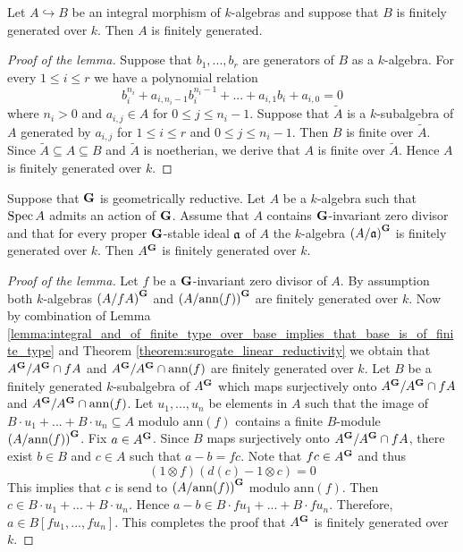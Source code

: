 \begin{lemma}\label{lemma:integral_and_of_finite_type_over_base_implies_that_base_is_of_finite_type}
Let $A\hookrightarrow B$ be an integral morphism of $k$-algebras and suppose that $B$ is finitely generated over $k$. Then $A$ is finitely generated.
\end{lemma}
\begin{proof}[Proof of the lemma]
Suppose that $b_1,...,b_r$ are generators of $B$ as a $k$-algebra. For every $1\leq i \leq r$ we have a polynomial relation
$$b_i^{n_i} + a_{i,n_i-1}b_i^{n_i-1}+...+a_{i,1}b_i+ a_{i,0} = 0$$
where $n_i > 0$ and $a_{i,j}\in A$ for $0\leq j\leq n_i-1$. Suppose that $\tilde{A}$ is a $k$-subalgebra of $A$ generated by $a_{i,j}$ for $1\leq i\leq r$ and $0\leq j\leq n_i-1$. Then $B$ is finite over $\tilde{A}$. Since $\tilde{A}\subseteq A\subseteq B$ and $\tilde{A}$ is noetherian, we derive that $A$ is finite over $\tilde{A}$. Hence $A$ is finitely generated over $k$.
\end{proof}

\begin{lemma}\label{lemma:nagata_theorem_case_of_invariant_zero_divisors}
Suppose that $\mathbf{G}$ is geometrically reductive. Let $A$ be a $k$-algebra such that $\mathrm{Spec}\, A$ admits an action of $\mathbf{G}$. Assume that $A$ contains $\mathbf{G}$-invariant zero divisor and that for every proper $\mathbf{G}$-stable ideal $\mathfrak{a}$ of $A$ the $k$-algebra $\left(A/\mathfrak{a}\right)^{\mathbf{G}}$ is finitely generated over $k$. Then $A^{\mathbf{G}}$ is finitely generated over $k$.
\end{lemma}
\begin{proof}[Proof of the lemma]
Let $f$ be a $\mathbf{G}$-invariant zero divisor of $A$. By assumption both $k$-algebras $\left(A/fA\right)^{\mathbf{G}}$ and $\left(A/\mathrm{ann}(f)\right)^{\mathbf{G}}$ are finitely generated over $k$. Now by combination of Lemma \ref{lemma:integral_and_of_finite_type_over_base_implies_that_base_is_of_finite_type} and Theorem \ref{theorem:surogate_linear_reductivity} we obtain that $A^{\mathbf{G}}/A^{\mathbf{G}}\cap fA$ and $A^{\mathbf{G}}/A^{\mathbf{G}}\cap \mathrm{ann}(f)$ are finitely generated over $k$. Let $B$ be a finitely generated $k$-subalgebra of $A^{\mathbf{G}}$ which maps surjectively onto $A^{\mathbf{G}}/A^{\mathbf{G}}\cap fA$ and $A^{\mathbf{G}}/A^{\mathbf{G}}\cap \mathrm{ann}(f)$. Let $u_1,...,u_n$ be elements in $A$ such that the image of $B\cdot u_1+...+B\cdot u_n\subseteq A$ modulo $\mathrm{ann}(f)$ contains a finite $B$-module $\left(A/\mathrm{ann}(f)\right)^{\mathbf{G}}$. Fix $a\in A^{\mathbf{G}}$. Since $B$ maps surjectively onto $A^{\mathbf{G}}/A^{\mathbf{G}}\cap fA$, there exist $b \in B$ and $c\in A$ such that $a - b = fc$. Note that $fc\in A^{\mathbf{G}}$ and thus
$$(1\otimes f)\left(d(c) - 1\otimes c\right) = 0$$
This implies that $c$ is send to $\left(A/\mathrm{ann}(f)\right)^{\mathbf{G}}$ modulo $\mathrm{ann}(f)$. Then $c \in B\cdot u_1 + ... + B\cdot u_n$. Hence $a - b \in B\cdot fu_1 + ... + B\cdot fu_n$. Therefore, $a\in B[fu_1,...,fu_n]$. This completes the proof that $A^{\mathbf{G}}$ is finitely generated over $k$.
\end{proof}

